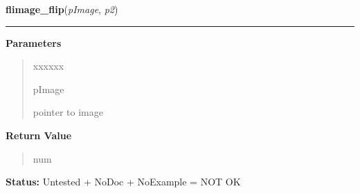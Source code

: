 \hspace{.8\funcindent}\begin{boxedminipage}{\funcwidth}

    \raggedright \textbf{flimage\_flip}(\textit{pImage}, \textit{p2})

    \vspace{-1.5ex}

    \rule{\textwidth}{0.5\fboxrule}
\setlength{\parskip}{2ex}
\setlength{\parskip}{1ex}
      \textbf{Parameters}
      \vspace{-1ex}

      \begin{quote}
        \begin{Ventry}{xxxxxx}

          \item[pImage]

          pointer to image

        \end{Ventry}

      \end{quote}

      \textbf{Return Value}
    \vspace{-1ex}

      \begin{quote}
      num

      \end{quote}

\textbf{Status:} Untested + NoDoc + NoExample = NOT OK



    \end{boxedminipage}

    \label{xformslib:library:flimage_scale}

    \vspace{0.5ex}

